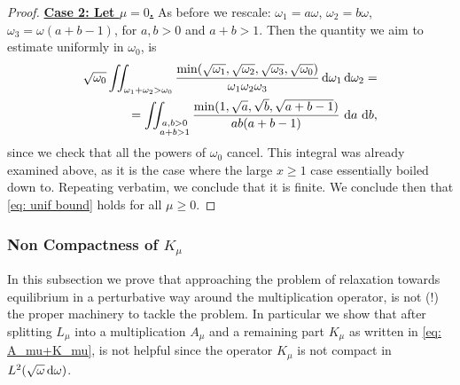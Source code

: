 \documentclass[reqno,11pt,letterpaper]{amsart}
\numberwithin{equation}{section}
\newcommand{\dd}{\, {\rm d}}
\begin{document}
\begin{proof}
 \noindent
    \underline{\textbf{Case 2: Let $\mu=0$.}} As before we rescale: $\omega_1= a \omega$, $\omega_2= b \omega$, $\omega_3= \omega(a+b-1)$, for $a,b>0$ and $a+b>1$. Then the quantity we aim to estimate uniformly in $\omega_0$, is 
    \begin{align*}
        \sqrt{\omega_0} 
 \iint_{\omega_1+\omega_2 > \omega_0} 
 \frac{ \min ( \sqrt{\omega_1}, \sqrt{\omega_2}, \sqrt{\omega_3}, \sqrt{\omega_0})}{\omega_1 \omega_2 \omega_3} \dd \omega_1 \dd \omega_2= \\
 = 
 \iint_{\substack{a,b>0\\ a+b>1}}
\frac{
\min(1,\sqrt a,\sqrt b,\sqrt{a+b-1})
}
{ab(a+b-1)}
\,\dd a\,\dd b, 
    \end{align*}
    since we check that all the powers of $\omega_0$ cancel. This integral was already examined above, as it is the case where the large $x\geq 1$ case essentially boiled down to. 
    Repeating verbatim, we conclude that it is finite. 
    We conclude then that \eqref{eq: unif bound} holds for all $\mu \geq 0.$   \end{proof}

\subsubsection{Non Compactness of $K_\mu$} \label{subsec:NoCompact}

In this subsection we prove that approaching the problem of relaxation towards equilibrium in a perturbative way around the multiplication operator, is not (!) the proper machinery to tackle the problem. 
In particular we show that after splitting $L_\mu$ into a multiplication $A_\mu$ and a remaining part $K_\mu$ as written in \eqref{eq: A_mu+K_mu}, is not helpful since the operator $K_\mu$ is not compact in $L^2(\sqrt{\omega} \dd \omega)$. 
\end{document}
